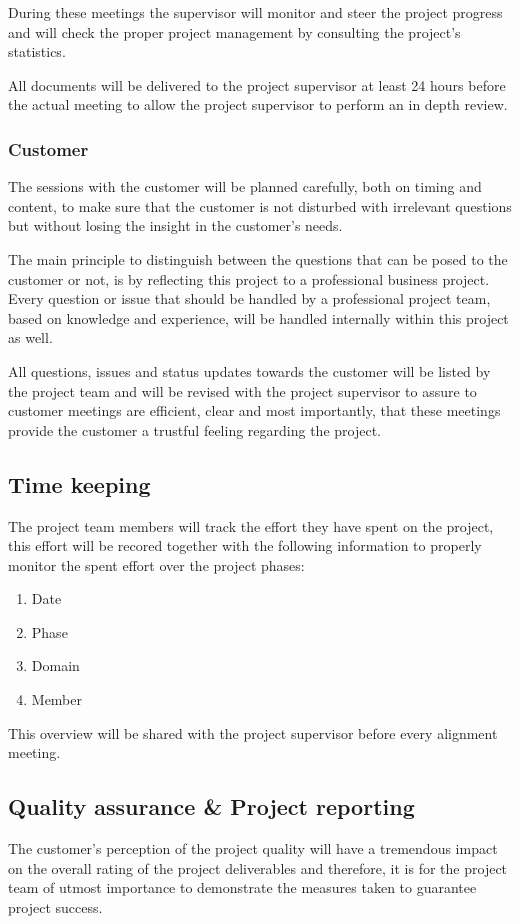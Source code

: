 During these meetings the supervisor will monitor and steer the project progress and will check the proper project management by consulting the project's statistics.

All documents will be delivered to the project supervisor at least 24 hours before the actual meeting to allow the project supervisor to perform an in depth review.

\subsubsection{Customer}
The sessions with the customer will be planned carefully, both on timing and content, to make sure that the customer is not disturbed  with irrelevant questions but without losing the insight in the customer's needs.

The main principle to distinguish between the questions that can be posed to the customer or not, is by reflecting this project to a professional business project.
Every question or issue that should be handled by a professional project team, based on knowledge and experience, will be handled internally within this project as well.

All questions, issues and status updates towards the customer will be listed by the project team and will be revised with the project supervisor to assure to customer meetings are efficient, clear and most importantly, that these meetings provide the customer a trustful feeling regarding the project.

\subsection{Time keeping}
The project team members will track the effort they have spent on the project, this effort will be recored together with the following information to properly monitor the spent effort over the project phases:
\begin{enumerate}
	\item Date
	\item Phase
	\item Domain
	\item Member
\end {enumerate}
This overview will be shared with the project supervisor before every alignment meeting.

\subsection{Quality assurance \& Project reporting}
The customer's perception of the project quality will have a tremendous impact on the overall rating of the project deliverables and therefore, it is for the project team of utmost importance to demonstrate the measures taken to guarantee project success.

